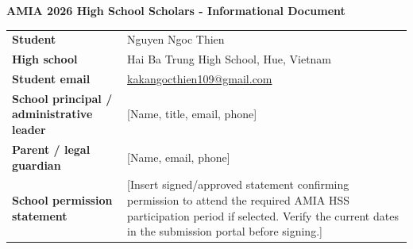 \documentclass[11pt,letterpaper]{article}
\begin{document}
\begin{center}
{\Large\bfseries AMIA 2026 High School Scholars - Informational Document}
\end{center}
\vspace{1em}
\renewcommand{\arraystretch}{1.4}
\begin{tabularx}{\textwidth}{>{\bfseries}p{}X}
Student & Nguyen Ngoc Thien \\
High school & Hai Ba Trung High School, Hue, Vietnam \\
Student email & \href{mailto:kakangocthien109@gmail.com}{kakangocthien109@gmail.com} \\
School principal / administrative leader & [Name, title, email, phone] \\
Parent / legal guardian & [Name, email, phone] \\
School permission statement & [Insert signed/approved statement confirming permission to attend the required AMIA HSS participation period if selected. Verify the current dates in the submission portal before signing.] \\
\end{tabularx}
\end{document}
